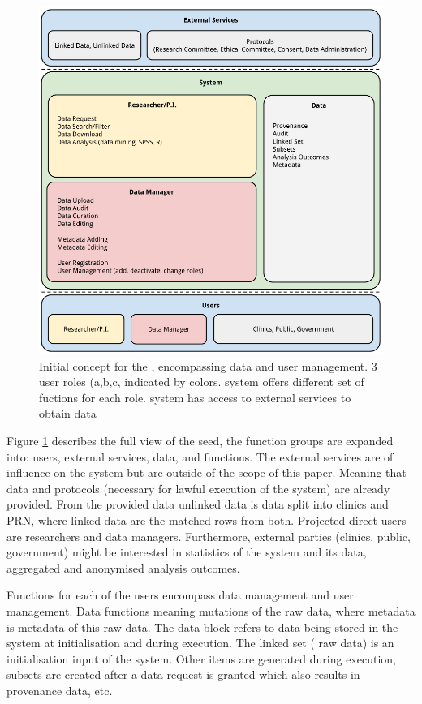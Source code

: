 \begin{figure}[t]
	\centering
	\includegraphics[width=1.0\linewidth]{images/brainstorm-before}
	\caption{
		Initial concept for the \ivfsystem{}, encompassing data and user management. 
		3 user roles (a,b,c, indicated by colors. system offers different set of fuctions for each role.
		system has access to external services to obtain data
	}
	\label{fig:brainstorm-before}
\end{figure}

Figure \ref{fig:brainstorm-before} describes the full view of the seed, the function groups are expanded into: users, external services, data, and functions.
The external services are of influence on the system but are outside of the scope of this paper.
Meaning that data and protocols (necessary for lawful execution of the system) are already provided.
From the provided data unlinked data is \project{} data split into clinics and PRN, where linked data are the matched rows from both.
Projected direct users are researchers and data managers.
Furthermore, external parties (clinics, public, government) might be interested in statistics of the system and its data, \eg{} aggregated and anonymised analysis outcomes.

Functions for each of the users encompass data management and user management.
Data functions meaning mutations of the raw \project{} data, where metadata is metadata of this raw data.
The data block refers to data being stored in the system at initialisation and during execution.
The linked set (\ie{} raw data) is an initialisation input of the system.
Other items are generated during execution, \eg{} subsets are created after a data request is granted which also results in provenance data, etc.